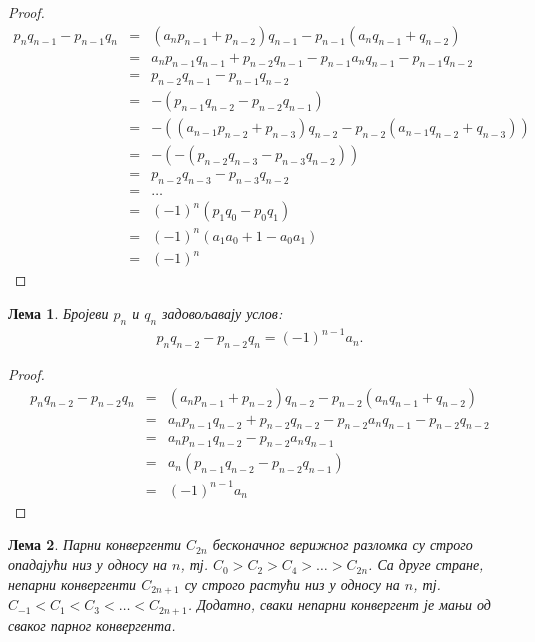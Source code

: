 \documentclass[a4paper]{article}
\newtheorem{lemma}{Лема}
\begin{document}
\begin{proof}
	\begin{eqnarray*}
		p_{n}q_{n-1} - p_{n-1}q_{n} &=& (a_{n}p_{n-1} + p_{n-2})q_{n-1} - p_{n-1}(a_{n}q_{n-1} + q_{n-2})\\
									&=& a_{n}p_{n-1}q_{n-1} + p_{n-2}q_{n-1} - p_{n-1}a_{n}q_{n-1} - p_{n-1}q_{n-2}\\
									&=& p_{n-2}q_{n-1} - p_{n-1}q_{n-2}\\
									&=& -(p_{n-1}q_{n-2} - p_{n-2}q_{n-1})\\
									&=& -((a_{n-1}p_{n-2} + p_{n-3})q_{n-2} - p_{n-2}(a_{n-1}q_{n-2} + q_{n-3}))\\
									&=& -(-(p_{n-2}q_{n-3} - p_{n-3}q_{n-2}))\\
									&=& p_{n-2}q_{n-3} - p_{n-3}q_{n-2}\\
									&=& \ldots\\
									&=& (-1)^{n}(p_{1}q_{0} - p_{0}q_{1})\\
									&=& (-1)^{n}(a_{1}a_{0} + 1 - a_{0}a_{1})\\
									&=& (-1)^{n}
	\end{eqnarray*}
\end{proof}

\begin{lemma}
	\label{lemma:svojstva_p_q_2}
	Бројеви $ p_{n} $ и $ q_{n} $ задовољавају услов:
	\begin{eqnarray}
	\label{c.f_svojstvo_2} p_{n}q_{n-2} - p_{n-2}q_{n} = (-1)^{n-1}a_{n}.
	\end{eqnarray}	
\end{lemma}

\begin{proof}
	\begin{eqnarray*}
		p_{n}q_{n-2} - p_{n-2}q_{n} &=& (a_{n}p_{n-1} + p_{n-2})q_{n-2} - p_{n-2}(a_{n}q_{n-1} + q_{n-2})\\
		&=& a_{n}p_{n-1}q_{n-2} + p_{n-2}q_{n-2} - p_{n-2}a_{n}q_{n-1} - p_{n-2}q_{n-2}\\
		&=& a_{n}p_{n-1}q_{n-2} - p_{n-2}a_{n}q_{n-1}\\
		&=& a_{n}(p_{n-1}q_{n-2} - p_{n-2}q_{n-1})\\
		&=& (-1)^{n-1}a_{n}
	\end{eqnarray*}
\end{proof}

\begin{lemma}
	\label{lemma:svojstva_konvergenata}
	Парни конвергенти $ C_{2n} $ бесконачног верижног разломка су строго опадајући низ у односу на $ n $, тј. $ C_{0} > C_{2} > C_{4} > \ldots > C_{2n} $. Са друге стране, непарни конвергенти $ C_{2n+1} $ су строго растући низ у односу на $ n $, тј. $ C_{-1} < C_{1} < C_{3} < \ldots < C_{2n+1} $. Додатно, сваки непарни конвергент је мањи од сваког парног конвергента.
\end{lemma}
\end{document}
